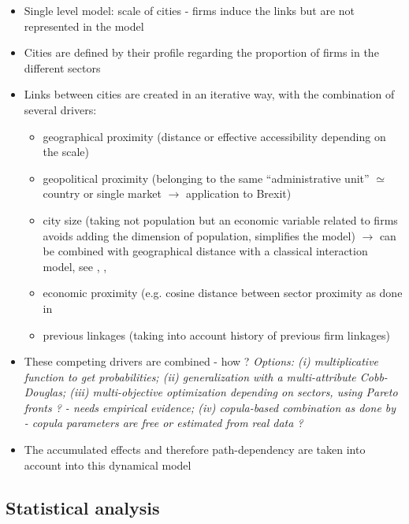 \documentclass{article}
\begin{document}
\begin{itemize}
    \item Single level model: scale of cities - firms induce the links but are not represented in the model
    \item Cities are defined by their profile regarding the proportion of firms in the different sectors
    \item Links between cities are created in an iterative way, with the combination of several drivers:
    \begin{itemize}
        \item geographical proximity (distance or effective accessibility depending on the scale)
        \item geopolitical proximity (belonging to the same ``administrative unit'' $\simeq$ country or single market $\rightarrow$ application to Brexit)
        \item city size (taking not population but an economic variable related to firms avoids adding the dimension of population, simplifies the model) $\rightarrow$ can be combined with geographical distance with a classical interaction model, see \cite{cottineau2015growing}, \cite{raimbault2018indirect}, \cite{favaro2011gibrat}
        \item economic proximity (e.g. cosine distance between sector proximity as done in \cite{2019arXiv190505106C}
        \item previous linkages (taking into account history of previous firm linkages)
    \end{itemize}
    \item These competing drivers are combined - how ? \textit{Options: (i) multiplicative function to get probabilities; (ii) generalization with a multi-attribute Cobb-Douglas; (iii) multi-objective optimization depending on sectors, using Pareto fronts ? - needs empirical evidence; (iv) copula-based combination as done by \cite{2019arXiv190505106C} - copula parameters are free or estimated from real data ?}
    \item The accumulated effects and therefore path-dependency are taken into account into this dynamical model
\end{itemize}


\subsection{Statistical analysis}


\end{document}
